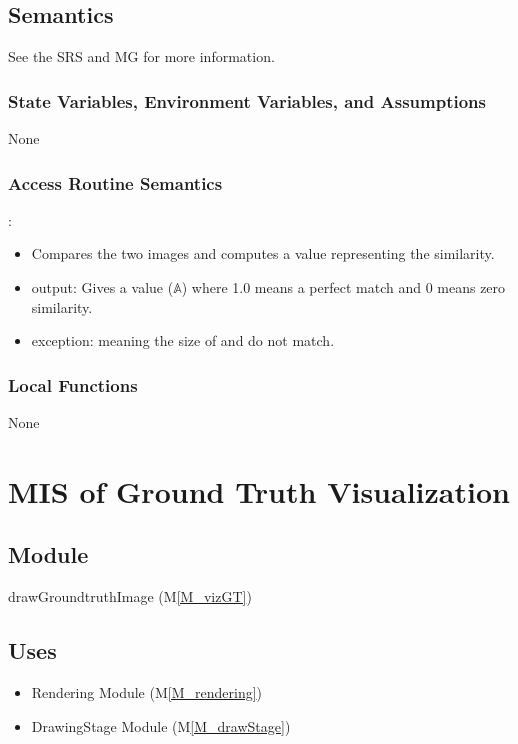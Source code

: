 \documentclass[12pt, titlepage]{article}
\newcommand{\mref}[1]{M\ref{#1}}
\newcommand{\mrefp}[1]{(\mref{#1})}
\newcommand{\mreff}[1]{Module \mrefp{#1}}
\begin{document}
\subsection{Semantics}
See the SRS \cite{SRS} and MG \cite{MG} for more information.

\subsubsection{State Variables, Environment Variables, and Assumptions}
None

\subsubsection{Access Routine Semantics}

\noindent {}:
\begin{itemize}
\item Compares the two images and computes a value representing the similarity.
\item output: Gives a value ($\mathbb{A}$) where 1.0 means a perfect match and 0 means zero similarity.
\item exception:  meaning the size of  and
   do not match.
\end{itemize}

\subsubsection{Local Functions}
None

\newpage


\section{MIS of Ground Truth Visualization} \label{MS_vizGT}

\subsection{Module}
drawGroundtruthImage \mrefp{M_vizGT}

\subsection{Uses}
\begin{itemize}
  \item Rendering \mreff{M_rendering}
  \item DrawingStage \mreff{M_drawStage}
\end{itemize}
\end{document}
